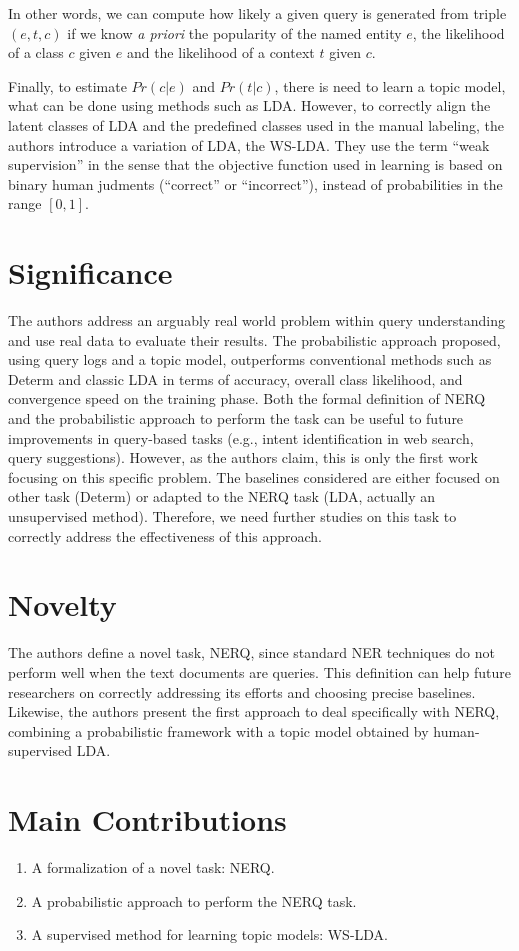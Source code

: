 \documentclass[sigconf]{acmart} %
\begin{document}
In other words, we can compute how likely a given query is generated from triple $(e, t, c)$ if we know \textit{a priori} the popularity of the named entity $e$, the likelihood of a class $c$ given $e$ and the likelihood of a context $t$ given $c$.
%

Finally, to estimate $Pr(c|e)$ and $Pr(t|c)$, there is need to learn a topic model, what can be done using methods such as LDA. However, to correctly align the latent classes of LDA and the predefined classes used in the manual labeling, the authors introduce a variation of LDA, the WS-LDA. They use the term ``weak supervision'' in the sense that the objective function used in learning is based on binary human judments (``correct'' or ``incorrect''), instead of probabilities in the range $[0,1]$.

\section{Significance}

The authors address an arguably real world problem within query understanding and use real data to evaluate their results. The probabilistic approach proposed, using query logs and a topic model, outperforms conventional methods such as Determ and classic LDA in terms of accuracy, overall class likelihood, and convergence speed on the training phase.
%
Both the formal definition of NERQ and the probabilistic approach to perform the task can be useful to future improvements in query-based tasks (e.g., intent identification in web search, query suggestions). However, as the authors claim, this is only the first work focusing on this specific problem. The baselines considered are either focused on other task (Determ) or adapted to the NERQ task (LDA, actually an unsupervised method). Therefore, we need further studies on this task to correctly address the effectiveness of this approach.

\section{Novelty}

The authors define a novel task, NERQ, since standard NER techniques do not perform well when the text documents are queries. This definition can help future researchers on correctly addressing its efforts and choosing precise baselines. Likewise, the authors present the first approach to deal specifically with NERQ, combining a probabilistic framework with a topic model obtained by human-supervised LDA.

\section{Main Contributions}

\begin{enumerate}
\item A formalization of a novel task: NERQ. 
\item A probabilistic approach to perform the NERQ task. 
\item A supervised method for learning topic models: WS-LDA.
\end{enumerate}
\end{document}
